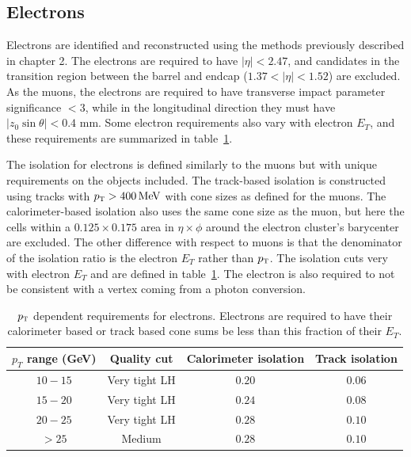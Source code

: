 \subsection{Electrons}

Electrons are identified and reconstructed using the methods previously described in chapter 2. The electrons are required to have $|\eta| < 2.47$, and candidates in the transition region between the barrel and endcap ($1.37 < |\eta| < 1.52$) are excluded. As the muons, the electrons are required to have transverse impact parameter significance $ < 3$, while in the longitudinal direction they must have $|z_0 \sin \theta| < 0.4$ mm. Some electron requirements also vary with electron $E_{T}$, and these requirements are summarized in table~\ref{tab:elecselec}.

The isolation for electrons is defined similarly to the muons but with unique requirements on the objects included. The track-based isolation is constructed using tracks with $\pT > 400 \MeV$ with cone sizes as defined for the muons. The calorimeter-based isolation also uses the same cone size as the muon, but here the cells within a $0.125 \times 0.175$ area in $\eta \times \phi$ around the electron cluster's barycenter are excluded. The other difference with respect to muons is that the denominator of the isolation ratio is the electron $E_{T}$ rather than $p_{\textrm{\footnotesize\sc t}}$. The isolation cuts very with electron $E_{T}$ and are defined in table~\ref{tab:elecselec}. The electron is also required to not be consistent with a vertex coming from a photon conversion. 


\begin{table}[h!]
\centering
\captionsetup{justification=centering}

\hspace{-10pt}
\begin{tabular}{|c|c|c|c|}
\hline
$p_T$ range (GeV) & Quality cut & Calorimeter isolation & Track isolation\\ \hline \hline
$10-15$ & Very tight LH & $0.20$ & $0.06$ \\ \hline
$15-20$ & Very tight LH & $0.24$ & $0.08$ \\ \hline
$20-25$ & Very tight LH & $0.28$ & $0.10$ \\ \hline
$> 25$ & Medium & $0.28$ & $0.10$ \\ \hline
\end{tabular}

\caption{
$p_{\textrm{\footnotesize\sc t}}$ dependent requirements for electrons. Electrons are required to have their calorimeter based or track based cone sums be less than this fraction of their $E_{T}$.
}
\label{tab:elecselec}
\end{table}

